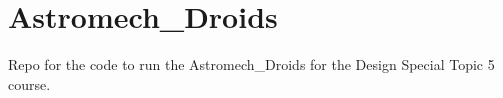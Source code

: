 \chapter{Astromech\+\_\+\+Droids }
\hypertarget{index}{}\label{index}
\label{index_md__c_1_2_users_2ryanm_2_documents_2_design_group_2_b_b8___s_t_m32_2_r_e_a_d_m_e}%
%


Repo for the code to run the Astromech\+\_\+\+Droids for the Design Special Topic 5 course. 